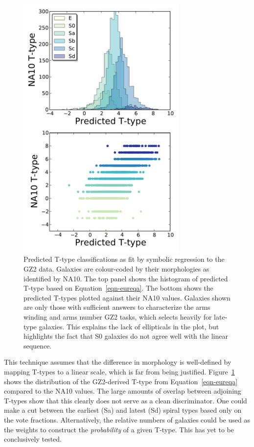 \documentclass[useAMS,usenatbib]{mn2e}
\begin{document}
\begin{figure}
\includegraphics[angle=0,width=3.3in]{figures/eureqa.pdf}
\caption{Predicted T-type classifications as fit by symbolic regression to the GZ2 data. Galaxies are colour-coded by their morphologies as identified by NA10. The top panel shows the histogram of predicted T-type based on Equation~\ref{eqn-eureqa}. The bottom shows the predicted T-types plotted against their NA10 values. Galaxies shown are only those with sufficient answers to characterize the arms winding and arms number GZ2 tasks, which selects heavily for late-type galaxies. This explains the lack of ellipticals in the plot, but highlights the fact that S0 galaxies do not agree well with the linear sequence. 
\label{fig-eureqa}}
\end{figure}

This technique assumes that the difference in morphology is well-defined by mapping T-types to a linear scale, which is far from being justified. Figure~\ref{fig-eureqa} shows the distribution of the GZ2-derived T-type from Equation~\ref{eqn-eureqa} compared to the NA10 values. The large amounts of overlap between adjoining T-types show that this clearly does not serve as a clean discriminator. One could make a cut between the earliest (Sa) and latest (Sd) spiral types based only on the vote fractions. Alternatively, the relative numbers of galaxies could be used as the weights to construct the {\em probability} of a given T-type. This has yet to be conclusively tested. 
\end{document}
